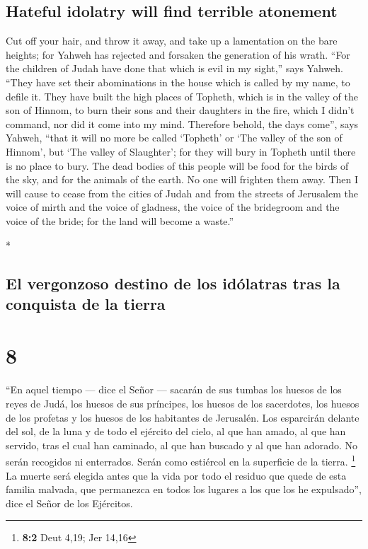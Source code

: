 \begin{paracol}{2}
\begin{otherlanguage}{english}
\hypertarget{hateful-idolatry-will-find-terrible-atonement}{%
\subsection{Hateful idolatry will find terrible
atonement}\label{hateful-idolatry-will-find-terrible-atonement}}

 Cut off your hair, and throw it away, and take up a
lamentation on the bare heights; for Yahweh has rejected and forsaken
the generation of his wrath.  ``For the children of Judah
have done that which is evil in my sight,'' says Yahweh. ``They have set
their abominations in the house which is called by my name, to defile
it.  They have built the high places of Topheth, which is
in the valley of the son of Hinnom, to burn their sons and their
daughters in the fire, which I didn't command, nor did it come into my
mind.  Therefore behold, the days come'', says Yahweh,
``that it will no more be called `Topheth' or `The valley of the son of
Hinnom', but `The valley of Slaughter'; for they will bury in Topheth
until there is no place to bury.  The dead bodies of this
people will be food for the birds of the sky, and for the animals of the
earth. No one will frighten them away.  Then I will cause
to cease from the cities of Judah and from the streets of Jerusalem the
voice of mirth and the voice of gladness, the voice of the bridegroom
and the voice of the bride; for the land will become a waste.''

\end{otherlanguage}

\switchcolumn[0]*

\hypertarget{el-vergonzoso-destino-de-los-iduxf3latras-tras-la-conquista-de-la-tierra}{%
\subsection{El vergonzoso destino de los idólatras tras la conquista de
la
tierra}\label{el-vergonzoso-destino-de-los-iduxf3latras-tras-la-conquista-de-la-tierra}}

\hypertarget{section-14}{%
\section{8}\label{section-14}}

 ``En aquel tiempo --- dice el Señor --- sacarán de sus
tumbas los huesos de los reyes de Judá, los huesos de sus príncipes, los
huesos de los sacerdotes, los huesos de los profetas y los huesos de los
habitantes de Jerusalén.  Los esparcirán delante del sol,
de la luna y de todo el ejército del cielo, al que han amado, al que han
servido, tras el cual han caminado, al que han buscado y al que han
adorado. No serán recogidos ni enterrados. Serán como estiércol en la
superficie de la tierra. \footnote{\textbf{8:2} Deut 4,19; Jer 14,16}
 La muerte será elegida antes que la vida por todo el
residuo que quede de esta familia malvada, que permanezca en todos los
lugares a los que los he expulsado'', dice el Señor de los Ejércitos.


\end{paracol}
